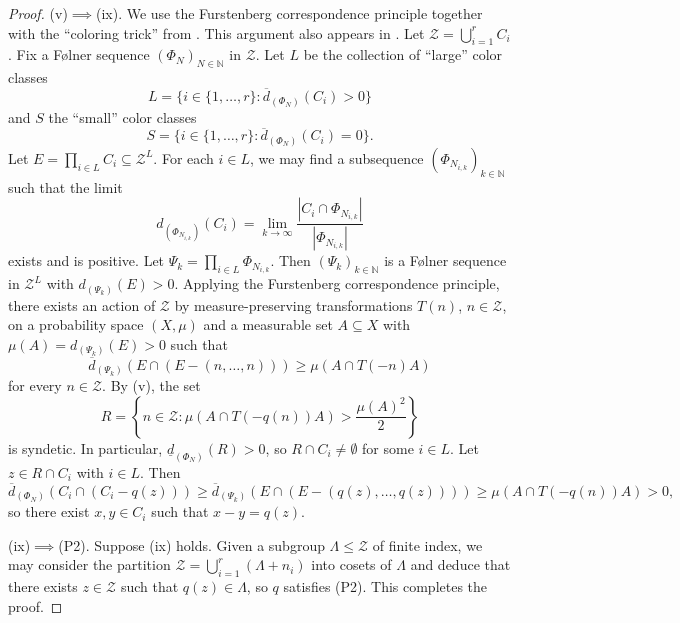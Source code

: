 \documentclass[11pt]{amsart}
\theoremstyle{theorem}
\theoremstyle{definition}
\newcommand{\N}{\mathbb{N}}
\newcommand{\mZ}{\mathcal{Z}}
\newcommand{\es}{\emptyset}
\begin{document}
\begin{proof}
    (v)$\implies$(ix).
    We use the Furstenberg correspondence principle together with the ``coloring trick'' from \cite{density_schur}.
    This argument also appears in \cite[Section 8]{ab_rings}.
    Let $\mZ = \bigcup_{i=1}^r C_i$.
    Fix a F{\o}lner sequence $(\Phi_N)_{N \in \N}$ in $\mZ$.
    Let $L$ be the collection of ``large'' color classes
    \begin{equation*}
        L = \{i \in \{1, \ldots, r\} : \overline{d}_{(\Phi_N)}(C_i) > 0\}
    \end{equation*}
    and $S$ the ``small'' color classes
    \begin{equation*}
        S = \{i \in \{1, \ldots, r\} : \overline{d}_{(\Phi_N)}(C_i) = 0\}.
    \end{equation*}
    Let $E = \prod_{i \in L} C_i \subseteq \mZ^L$.
    For each $i \in L$, we may find a subsequence $(\Phi_{N_{i,k}})_{k \in \N}$ such that the limit
    \begin{equation*}
        d_{(\Phi_{N_{i,k}})}(C_i) = \lim_{k \to \infty} \frac{|C_i \cap \Phi_{N_{i,k}}|}{|\Phi_{N_{i,k}}|}
    \end{equation*}
    exists and is positive.
    Let $\Psi_k = \prod_{i \in L} \Phi_{N_{i,k}}$.
    Then $(\Psi_k)_{k \in \N}$ is a F{\o}lner sequence in $\mZ^L$ with $d_{(\Psi_k)}(E) > 0$.
    Applying the Furstenberg correspondence principle, there exists an action of $\mZ$ by measure-preserving transformations $T(n)$, $n \in \mZ$, on a probability space $(X, \mu)$ and a measurable set $A \subseteq X$ with $\mu(A) = d_{(\Psi_k)}(E) > 0$ such that
    \begin{equation*}
        \overline{d}_{(\Psi_k)} \left( E \cap (E - (n,\ldots,n)) \right) \ge \mu(A \cap T(-n)A)
    \end{equation*}
    for every $n \in \mZ$.
    By (v), the set
    \begin{equation*}
        R = \left\{ n \in \mZ : \mu(A \cap T(-q(n))A) > \frac{\mu(A)^2}{2} \right\}
    \end{equation*}
    is syndetic.
    In particular, $\underline{d}_{(\Phi_N)}(R) > 0$, so $R \cap C_i \ne \es$ for some $i \in L$.
    Let $z \in R \cap C_i$ with $i \in L$.
    Then
    \begin{equation*}
        \overline{d}_{(\Phi_N)}(C_i \cap (C_i - q(z))) \ge \overline{d}_{(\Psi_k)}(E \cap (E - (q(z), \ldots, q(z)))) \ge \mu(A \cap T(-q(n))A) > 0,
    \end{equation*}
    so there exist $x, y \in C_i$ such that $x - y = q(z)$.

    (ix)$\implies$(P2).
    Suppose (ix) holds.
    Given a subgroup $\Lambda \le \mZ$ of finite index, we may consider the partition $\mZ = \bigcup_{i=1}^r (\Lambda + n_i)$ into cosets of $\Lambda$ and deduce that there exists $z \in \mZ$ such that $q(z) \in \Lambda$, so $q$ satisfies (P2).
    This completes the proof.
\end{proof}
\end{document}
